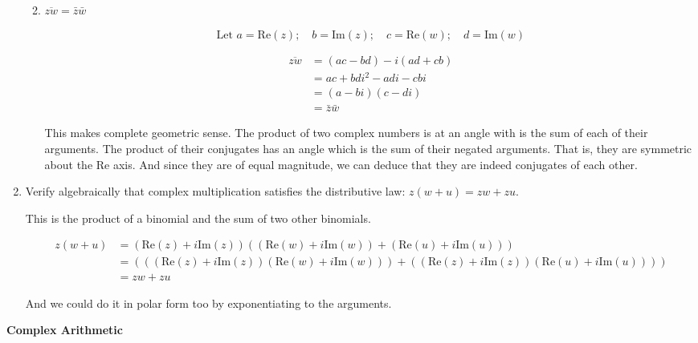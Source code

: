 \documentclass{book}
\begin{document}
\begin{enumerate}[label=\arabic*)]
\begin{enumerate}[label=(\alph*)]
\begin{enumerate}
\end{enumerate}

\item $\overline{zw}=\bar{z}\bar{w}$

\[\mbox{Let }a=\mbox{Re}(z);\quad b=\mbox{Im}(z);\quad c=\mbox{Re}(w);\quad d=\mbox{Im}(w)\]

\begin{align*}
\overline{zw}&=(ac-bd)-i(ad+cb)\\
&=ac+bdi^2-adi-cbi\\
&=(a-bi)(c-di)\\
&=\bar{z}\bar{w}
\end{align*}

This makes complete geometric sense. The product of two complex numbers is at an angle with is the sum of each of their arguments. The product of their conjugates has an angle which is the sum of their negated arguments. That is, they are symmetric about the Re axis. And since they are of equal magnitude, we can deduce that they are indeed conjugates of each other.
\end{enumerate}

\item Verify algebraically that complex multiplication satisfies the  distributive law: $z(w+u)=zw+zu$.

This is the product of a binomial and the sum of two other binomials.

\begin{align*}
z(w+u)&=(\mbox{Re}(z)+i\mbox{Im}(z))((\mbox{Re}(w)+i\mbox{Im}(w))+(\mbox{Re}(u)+i\mbox{Im}(u)))\\
&=(((\mbox{Re}(z)+i\mbox{Im}(z))(\mbox{Re}(w)+i\mbox{Im}(w)))+((\mbox{Re}(z)+i\mbox{Im}(z))(\mbox{Re}(u)+i\mbox{Im}(u))))\\
&=zw+zu
\end{align*}

And we could do it in polar form too by exponentiating to the arguments.
\end{enumerate}

\vspace{10pt}

{\bf{}Complex Arithmetic}
\end{document}
